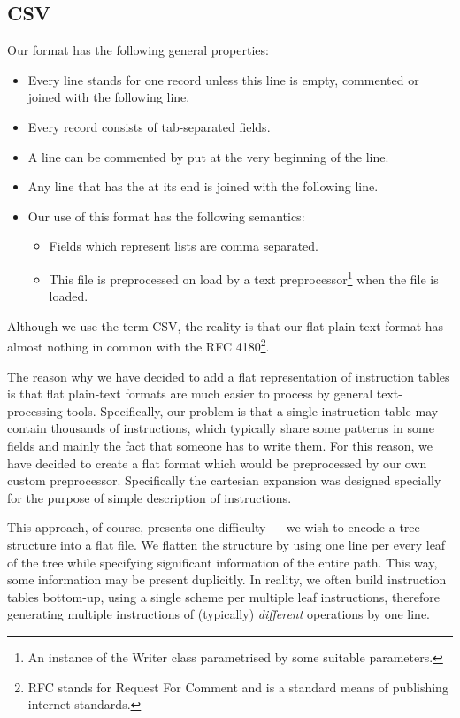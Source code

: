 \subsection{CSV}

Our format has the following general properties:
\begin{itemize}
  \item Every line stands for one record unless this line is empty, commented or joined with the following line.
  \item Every record consists of tab-separated fields.
  \item A line can be commented by \ttt{\#} put at the very beginning of the line.
  \item Any line that has the \ttt{\textbackslash} at its end is joined with the following line.
  \item Our use of this format has the following semantics:
  \begin{itemize}
	\item Fields which represent lists are comma separated.
	\item This file is preprocessed on load by a text preprocessor\footnote{An instance of the Writer class parametrised by some suitable parameters.} when the file is loaded.
  \end{itemize}
\end{itemize}

Although we use the term CSV, the reality is that our flat plain-text format has almost nothing in common with the RFC 4180\footnote{RFC stands for Request For Comment and is a standard means of publishing internet standards.}.

The reason why we have decided to add a flat representation of instruction tables is that flat plain-text formats are much easier to process by general text-processing tools. Specifically, our problem is that a single instruction table may contain thousands of instructions, which typically share some patterns in some fields and mainly the fact that someone has to write them. For this reason, we have decided to create a flat format which would be preprocessed by our own custom preprocessor. Specifically the cartesian expansion was designed specially for the purpose of simple description of instructions.

This approach, of course, presents one difficulty --- we wish to encode a tree structure into a flat file. We flatten the structure by using one line per every leaf of the tree while specifying significant information of the entire path. This way, some information may be present duplicitly. In reality, we often build instruction tables bottom-up, using a single scheme per multiple leaf instructions, therefore generating multiple instructions of (typically) \emph{different} operations by one line. 

